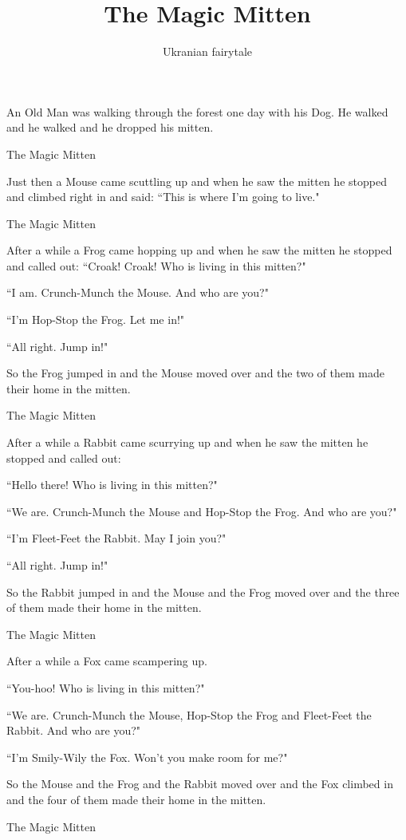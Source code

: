 \documentclass{article}
\title{The Magic Mitten}
\author{Ukranian fairytale}
\begin{document}
\maketitle

An Old Man was walking through the forest one day with his Dog. He walked and he walked and he dropped his mitten.

The Magic Mitten

Just then a Mouse came scuttling up and when he saw the mitten he stopped and climbed right in and said: ``This is where I'm going to live."

The Magic Mitten

After a while a Frog came hopping up and when he saw the mitten he stopped and called out:
``Croak! Croak! Who is living in this mitten?"

``I am. Crunch-Munch the Mouse. And who are you?"

``I'm Hop-Stop the Frog. Let me in!"

``All right. Jump in!"

So the Frog jumped in and the Mouse moved over and the two of them made their home in the mitten.

The Magic Mitten

After a while a Rabbit came scurrying up and when he saw the mitten he stopped and called out:

``Hello there! Who is living in this mitten?"

``We are. Crunch-Munch the Mouse and Hop-Stop the Frog. And who are you?"

``I'm Fleet-Feet the Rabbit. May I join you?"

``All right. Jump in!"

So the Rabbit jumped in and the Mouse and the Frog moved over and the three of them made their home in the mitten.

The Magic Mitten

After a while a Fox came scampering up.

``You-hoo! Who is living in this mitten?"

``We are. Crunch-Munch the Mouse, Hop-Stop the Frog and Fleet-Feet the Rabbit. And who are you?"

``I'm Smily-Wily the Fox. Won't you make room for me?"

So the Mouse and the Frog and the Rabbit moved over and the Fox climbed in and the four of them made their home in the mitten.

The Magic Mitten
\end{document}
